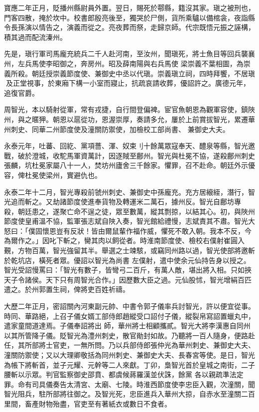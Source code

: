 \begin{pinyinscope}
 寶應二年正月，貶播州縣尉員外置。翌日，賜死於鄠縣，籍沒其家。瑱之被刑也，門客四散，掩於坎中。校書郎殷亮後至，獨哭於尸側，貨所乘驢以備棺衾，夜詣縣令長孫演以情告之，演義而從之。亮夜葬而祭，走歸京師。代宗既悟元振之誣構，積其過而配流溱州。



 先是，瑱行軍司馬龐充統兵二千人赴河南，至汝州，聞瑱死，將士魚目等回兵襲襄州，左兵馬使李昭御之，奔房州。昭及薛南陽與右兵馬使
 梁崇義不葉相圖，為崇義所殺。朝廷授崇義節度使、兼御史中丞以代瑱。崇義瑱立祠，四時拜饗，不居瑱及正堂視事，於東廂下構一小室而寢止，抗疏哀請收葬，優詔許之。廣德元年，追復官爵。



 周智光，本以騎射從軍，常有戎捷，自行間登偏裨。宦官魚朝恩為觀軍容使，鎮陜州，與之暱狎。朝恩以扈從功，恩渥崇厚，奏請多允，屢於上前賞拔智光，累遷華州刺史、同華二州節度使及潼關防禦使，加檢校工部尚書、
 兼御史大夫。



 永泰元年，吐蕃、回紇、黨項薔、渾、奴束刂十餘萬眾寇奉天、醴泉等縣，智光邀戰，破於澄城，收駝馬軍資萬計，因逐賊至鄜州。智光與杜冕不協，遂殺鄜州刺史張麟，坑杜冕家屬八十一人，焚坊州廬舍三千餘家。懼罪，召不赴命。朝廷外示優容，俾杜冕使梁州，實避仇也。



 永泰二年十二月，智光專殺前虢州刺史、兼御史中孫龐充。充方居縗絰，潛行，智光追而斬之。又劫諸節度使進奉貨物及轉運米二萬石，據州反。智光自鄜坊專
 殺，朝廷患之，遂聚亡命不逞之徒，眾至數萬，縱其剽掠，以結其心。初，與陜州節度使皇甫溫不協，監軍張志斌自陜入奏，智光館給禮慢，志斌責其不肅。智光大怒曰：「僕固懷恩豈有反狀！皆由爾鼠輩作福作威，懼死不敢入朝。我本不反，今為爾作之。」因叱下斬之，臠其肉以飼從者。時淮南節度使、檢校右僕射崔圓入覲，方物百萬，智光強留其半。舉選之士竦駭，或竊同州路以過，智光使部將邀斬於乾坑店，橫死者眾。優詔以智光為尚書
 左僕射，遣中使余元仙持告身以授之。智光受詔慢罵曰：「智光有數子，皆彎弓二百斤，有萬人敵，堪出將入相。只如挾天子令諸侯。天下只有周智光合作。」因歷數大臣之過。元仙股怵，智光增絹百匹遣之。於州郭置生祠，俾將吏百姓祈禱。



 大歷二年正月，密詔關內河東副元帥、中書令郭子儀率兵討智光，許以便宜從事。時同、華路絕，上召子儀女婿工部侍郎趙縱受口詔付子儀，縱裂帛寫詔置蠟丸中，遣家童間道達焉。子儀奉詔將出
 師，華州將士相顧攜貳。智光大將李漢惠自同州以其所管降子儀。貶智光為澧州刺史，散官勛封如故。乃聽將一百人隨身，便路赴任，其所部將士官吏，一無所問。乃以兵部侍郎張仲光為華州刺史、兼御史大夫、潼關防禦使；又以大理卿敬括為同州刺史、兼御史大夫、長春宮等使。是日，智光為帳下將斬首，並子元耀、元幹等二人來獻。丁卯，梟智光首於皇城之南街，二子腰斬以示眾。判官監察御史邵賁、都虞候蔣羅漢並伏誅，餘黨
 各以親疏準法定罪。命有司具儀奏告太清宮、太廟、七陵。時淮西節度使李忠臣入觀，次潼關，聞智光阻兵，駐所部將往御之。及智光死，忠臣進兵入華州大掠，自赤水至潼關二百里間，畜產財物殆盡，官吏至有著紙衣或數日不食者。




\end{pinyinscope}
